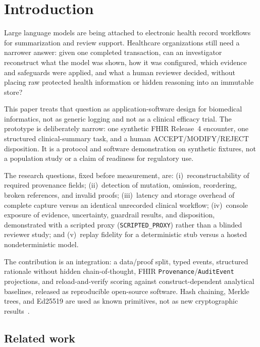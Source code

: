\documentclass[preprint,review,12pt]{elsarticle}
\begin{document}
\linenumbers

\section{Introduction}
\label{sec:intro}

Large language models are being attached to electronic health record
workflows for summarization and review support. Healthcare organizations still
need a narrower answer: given one completed transaction, can an investigator
reconstruct what the model was shown, how it was configured, which evidence
and safeguards were applied, and what a human reviewer decided, without
placing raw protected health information or hidden reasoning into an immutable
store?

This paper treats that question as application-software design for
biomedical informatics, not as generic logging and not as a clinical efficacy
trial. The prototype is deliberately narrow: one synthetic FHIR Release~4
encounter, one structured clinical-summary task, and a human
ACCEPT/MODIFY/REJECT disposition. It is a protocol and software demonstration
on synthetic fixtures, not a population study or a claim of readiness for
regulatory use.

The research questions, fixed before measurement, are: (i)~reconstructability
of required provenance fields; (ii)~detection of mutation, omission,
reordering, broken references, and invalid proofs; (iii)~latency and storage
overhead of complete capture versus an identical unrecorded clinical workflow;
(iv)~console exposure of evidence, uncertainty, guardrail results, and
disposition, demonstrated with a scripted proxy (\texttt{SCRIPTED\_PROXY})
rather than a blinded reviewer study; and (v)~replay fidelity for a
deterministic stub versus a hosted nondeterministic model.

The contribution is an integration: a data/proof split, typed events,
structured rationale without hidden chain-of-thought, FHIR
\texttt{Provenance}/\texttt{AuditEvent} projections, and reload-and-verify
scoring against construct-dependent analytical baselines, released as
reproducible open-source software. Hash chaining, Merkle trees, and Ed25519
are used as known primitives, not as new cryptographic
results~\cite{haber1991timestamp,merkle1988signature,rfc8032}.

\subsection{Related work}
\label{sec:related}
\end{document}
